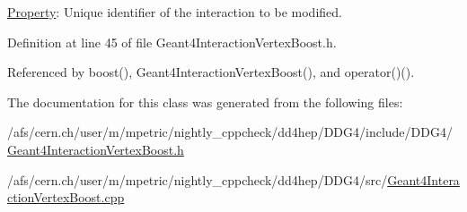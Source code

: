 \hyperlink{class_d_d4hep_1_1_property}{Property}: Unique identifier of the interaction to be modified. 

Definition at line 45 of file Geant4InteractionVertexBoost.h.

Referenced by boost(), Geant4InteractionVertexBoost(), and operator()().

The documentation for this class was generated from the following files:\begin{DoxyCompactItemize}
\item 
/afs/cern.ch/user/m/mpetric/nightly\_\-cppcheck/dd4hep/DDG4/include/DDG4/\hyperlink{_geant4_interaction_vertex_boost_8h}{Geant4InteractionVertexBoost.h}\item 
/afs/cern.ch/user/m/mpetric/nightly\_\-cppcheck/dd4hep/DDG4/src/\hyperlink{_geant4_interaction_vertex_boost_8cpp}{Geant4InteractionVertexBoost.cpp}\end{DoxyCompactItemize}
